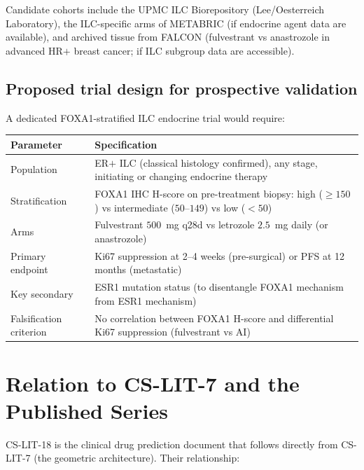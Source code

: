 \documentclass[12pt, a4paper]{article}
\begin{document}
Candidate cohorts include the UPMC ILC Biorepository
(Lee/Oesterreich Laboratory), the ILC-specific
arms of METABRIC (if endocrine agent data are
available), and archived tissue from FALCON
(fulvestrant vs anastrozole in advanced HR$+$
breast cancer; if ILC subgroup data are accessible).

\subsection{Proposed trial design for prospective
validation}

A dedicated FOXA1-stratified ILC endocrine trial
would require:

\begin{center}
\begin{tabular}{p{3.5cm}p{8cm}}
\toprule
\textbf{Parameter} & \textbf{Specification} \\
\midrule
Population &
ER$+$ ILC (classical histology confirmed), any
stage, initiating or changing endocrine therapy \\[0.4em]
Stratification &
FOXA1 IHC H-score on pre-treatment biopsy:
high ($\geq150$) vs intermediate ($50$--$149$)
vs low ($<50$) \\[0.4em]
Arms &
Fulvestrant $500$~mg q28d vs letrozole $2.5$~mg
daily (or anastrozole) \\[0.4em]
Primary endpoint &
Ki67 suppression at 2--4 weeks (pre-surgical)
or PFS at 12 months (metastatic) \\[0.4em]
Key secondary &
ESR1 mutation status (to disentangle FOXA1
mechanism from ESR1 mechanism) \\[0.4em]
Falsification criterion &
No correlation between FOXA1 H-score and
differential Ki67 suppression (fulvestrant vs AI) \\
\bottomrule
\end{tabular}
\end{center}

\section{Relation to CS-LIT-7 and the
Published Series}

CS-LIT-18 is the clinical drug prediction document
that follows directly from CS-LIT-7 (the geometric
architecture). Their relationship:
\end{document}
